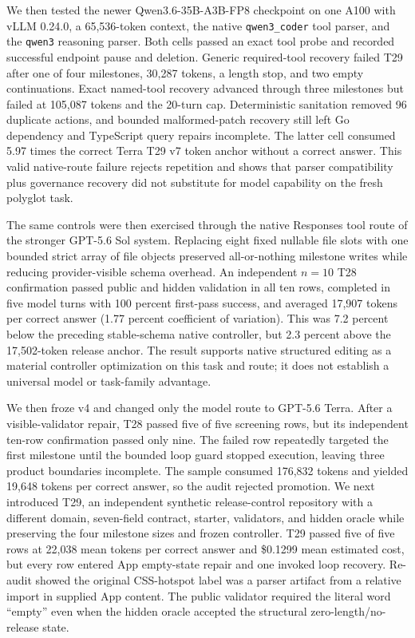 \documentclass[10pt,twocolumn]{article}
\begin{document}
We then tested the newer Qwen3.6-35B-A3B-FP8 checkpoint on one A100 with vLLM
0.24.0, a 65,536-token context, the native \texttt{qwen3\_coder} tool parser,
and the \texttt{qwen3} reasoning parser. Both cells passed an exact tool probe
and recorded successful endpoint pause and deletion. Generic required-tool
recovery failed T29 after one of four milestones, 30,287 tokens, a length stop,
and two empty continuations. Exact named-tool recovery advanced through three
milestones but failed at 105,087 tokens and the 20-turn cap. Deterministic
sanitation removed 96 duplicate actions, and bounded malformed-patch recovery
still left Go dependency and TypeScript query repairs incomplete. The latter
cell consumed 5.97 times the correct Terra T29 v7 token anchor without a correct
answer. This valid native-route failure rejects repetition and shows that parser
compatibility plus governance recovery did not substitute for model capability
on the fresh polyglot task.

The same controls were then exercised through the native Responses tool route
of the stronger GPT-5.6 Sol system. Replacing eight fixed nullable file slots
with one bounded strict array of file objects preserved all-or-nothing
milestone writes while reducing provider-visible schema overhead. An
independent $n=10$ T28 confirmation passed public and hidden validation in all
ten rows, completed in five model turns with 100 percent first-pass success,
and averaged 17,907 tokens per correct answer (1.77 percent coefficient of
variation). This was 7.2 percent below the preceding stable-schema native
controller, but 2.3 percent above the 17,502-token release anchor. The result
supports native structured editing as a material controller optimization on
this task and route; it does not establish a universal model or task-family
advantage.

We then froze v4 and changed only the model route to GPT-5.6 Terra. After a
visible-validator repair, T28 passed five of five screening rows, but its
independent ten-row confirmation passed only nine. The failed row repeatedly
targeted the first milestone until the bounded loop guard stopped execution,
leaving three product boundaries incomplete. The sample consumed 176,832
tokens and yielded 19,648 tokens per correct answer, so the audit rejected
promotion. We next introduced T29, an independent synthetic release-control
repository with a different domain, seven-field contract, starter,
validators, and hidden oracle while preserving the four milestone sizes and
frozen controller. T29 passed five of five rows at 22,038 mean tokens per
correct answer and \$0.1299 mean estimated cost, but every row entered App
empty-state repair and one invoked loop recovery. Re-audit showed the original
CSS-hotspot label was a parser artifact from a relative import in supplied App
content. The public validator required the literal word ``empty'' even when
the hidden oracle accepted the structural zero-length/no-release state.
\end{document}
